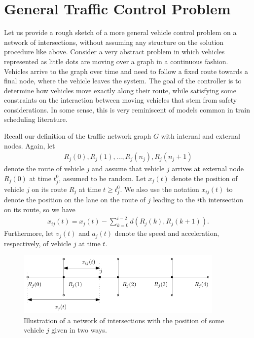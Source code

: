 \documentclass{article}
\theoremstyle{definition}
\theoremstyle{plain}
\begin{document}
\section{General Traffic Control Problem}
\label{sec:general}

Let us provide a rough sketch of a more general vehicle control problem on a
network of intersections, without assuming any structure on the solution
procedure like above. Consider a very abstract problem in which vehicles
represented as little dots are moving over a graph in a continuous fashion.
Vehicles arrive to the graph over time and need to follow a fixed route towards
a final node, where the vehicle leaves the system. The goal of the controller is
to determine how vehicles move exactly along their route, while satisfying some
constraints on the interaction between moving vehicles that stem from safety
considerations. In some sense, this is very reminiscent of models common in
train scheduling literature.

Recall our definition of the traffic network graph $G$ with internal and
external nodes. Again, let
\begin{align*}
  R_{j}(0), R_{j}(1), \dots, R_{j}(n_{j}), R_{j}(n_{j}+1)
\end{align*}
denote the route of vehicle $j$ and assume that vehicle $j$ arrives at external
node $R_{j}(0)$ at time $t_{j}^{0}$, assumed to be random. Let $x_{j}(t)$ denote
the position of vehicle $j$ on its route $R_{j}$ at time $t \geq t_{j}^{0}$. We
also use the notation $x_{ij}(t)$ to denote the position on the lane on the
route of $j$ leading to the $i$th intersection on its route, so we have
\begin{align}
  x_{ij}(t) = x_{j}(t) - \sum_{k=0}^{i-2} d(R_{j}(k), R_{j}(k+1)) .
\end{align}
Furthermore, let $v_{j}(t)$ and $a_{j}(t)$ denote the speed and acceleration,
respectively, of vehicle $j$ at time $t$.

\begin{figure}[b]
  \centering
  \includegraphics[width=0.9\textwidth]{figures/general_traffic_model.pdf}
  \caption{Illustration of a network of intersections with the position of some
    vehicle $j$ given in two ways.}
  \label{fig:general-model}
\end{figure}
\end{document}
